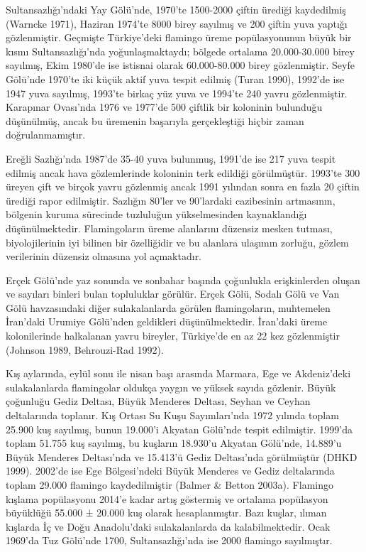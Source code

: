 \documentclass[
  letterpaper,
  DIV=11,
  numbers=noendperiod]{scrreprt}
\begin{document}
Sultansazlığı'ndaki Yay Gölü'nde, 1970'te 1500-2000 çiftin ürediği
kaydedilmiş (Warncke 1971), Haziran 1974'te 8000 birey sayılmış ve 200
çiftin yuva yaptığı gözlenmiştir. Geçmişte Türkiye'deki flamingo üreme
popülasyonunun büyük bir kısmı Sultansazlığı'nda yoğunlaşmaktaydı;
bölgede ortalama 20.000-30.000 birey sayılmış, Ekim 1980'de ise istisnai
olarak 60.000-80.000 birey gözlenmiştir. Seyfe Gölü'nde 1970'te iki
küçük aktif yuva tespit edilmiş (Turan 1990), 1992'de ise 1947 yuva
sayılmış, 1993'te birkaç yüz yuva ve 1994'te 240 yavru gözlenmiştir.
Karapınar Ovası'nda 1976 ve 1977'de 500 çiftlik bir koloninin bulunduğu
düşünülmüş, ancak bu üremenin başarıyla gerçekleştiği hiçbir zaman
doğrulanmamıştır.

Ereğli Sazlığı'nda 1987'de 35-40 yuva bulunmuş, 1991'de ise 217 yuva
tespit edilmiş ancak hava gözlemlerinde koloninin terk edildiği
görülmüştür. 1993'te 300 üreyen çift ve birçok yavru gözlenmiş ancak
1991 yılından sonra en fazla 20 çiftin ürediği rapor edilmiştir.
Sazlığın 80'ler ve 90'lardaki cazibesinin artmasının, bölgenin kuruma
sürecinde tuzluluğun yükselmesinden kaynaklandığı düşünülmektedir.
Flamingoların üreme alanlarını düzensiz mesken tutması, biyolojilerinin
iyi bilinen bir özelliğidir ve bu alanlara ulaşımın zorluğu, gözlem
verilerinin düzensiz olmasına yol açmaktadır.

Erçek Gölü'nde yaz sonunda ve sonbahar başında çoğunlukla erişkinlerden
oluşan ve sayıları binleri bulan topluluklar görülür. Erçek Gölü, Sodalı
Gölü ve Van Gölü havzasındaki diğer sulakalanlarda görülen
flamingoların, muhtemelen İran'daki Urumiye Gölü'nden geldikleri
düşünülmektedir. İran'daki üreme kolonilerinde halkalanan yavru
bireyler, Türkiye'de en az 22 kez gözlenmiştir (Johnson 1989,
Behrouzi-Rad 1992).

Kış aylarında, eylül sonu ile nisan başı arasında Marmara, Ege ve
Akdeniz'deki sulakalanlarda flamingolar oldukça yaygın ve yüksek sayıda
gözlenir. Büyük çoğunluğu Gediz Deltası, Büyük Menderes Deltası, Seyhan
ve Ceyhan deltalarında toplanır. Kış Ortası Su Kuşu Sayımları'nda 1972
yılında toplam 25.900 kuş sayılmış, bunun 19.000'i Akyatan Gölü'nde
tespit edilmiştir. 1999'da toplam 51.755 kuş sayılmış, bu kuşların
18.930'u Akyatan Gölü'nde, 14.889'u Büyük Menderes Deltası'nda ve
15.413'ü Gediz Deltası'nda görülmüştür (DHKD 1999). 2002'de ise Ege
Bölgesi'ndeki Büyük Menderes ve Gediz deltalarında toplam 29.000
flamingo kaydedilmiştir (Balmer \& Betton 2003a). Flamingo kışlama
popülasyonu 2014'e kadar artış göstermiş ve ortalama popülasyon
büyüklüğü 55.000 ± 20.000 kuş olarak hesaplanmıştır. Bazı kuşlar, ılıman
kışlarda İç ve Doğu Anadolu'daki sulakalanlarda da kalabilmektedir. Ocak
1969'da Tuz Gölü'nde 1700, Sultansazlığı'nda ise 2000 flamingo
sayılmıştır.
\end{document}
